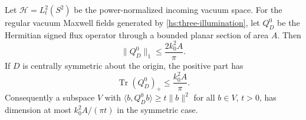 \begin{lemma}
\label{cg:vacuum-trace}
Let $\mathcal H=L^2_t(S^2)$ be the power-normalized incoming vacuum
space.  For the regular vacuum Maxwell fields generated by
\eqref{hs:three-illumination}, let $Q_D^0$ be the Hermitian signed
flux operator through a bounded planar section of area $A$.  Then
\begin{equation}\label{cg:trace-bound}
 \|Q_D^0\|_1\leq\frac{2k_0^2A}{\pi}.
\end{equation}
If $D$ is centrally symmetric about the origin, the positive part has
\begin{equation}\label{cg:positive-trace}
 \operatorname{Tr}(Q_D^0)_+\leq\frac{k_0^2A}{\pi}.
\end{equation}
Consequently a subspace $V$ with
$\langle b,Q_D^0b\rangle\geq t\|b\|^2$ for all $b\in V$,
$t>0$, has dimension at most $k_0^2A/(\pi t)$ in the symmetric case.
\end{lemma}
